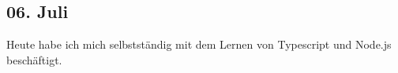 \subsection{06. Juli}
Heute habe ich mich selbstständig mit dem Lernen von Typescript und Node.js beschäftigt.